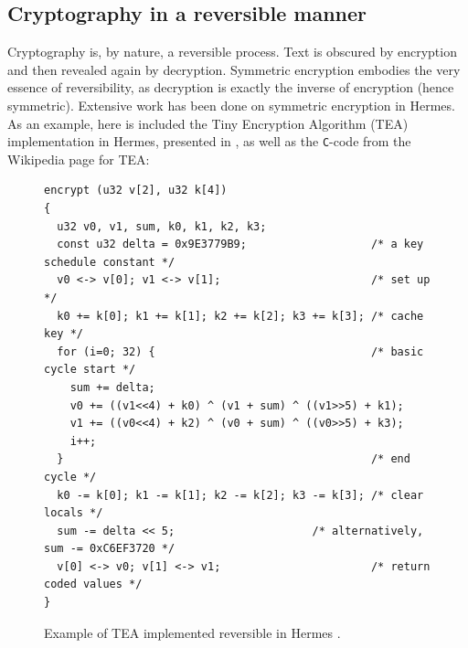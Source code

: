 \subsection{Cryptography in a reversible manner}
\label{reverseCrypt}
Cryptography is, by nature, a reversible process. Text is obscured by encryption and then revealed again by decryption. Symmetric encryption embodies the very essence of reversibility, as decryption is exactly the inverse of encryption (hence symmetric). Extensive work has been done on symmetric encryption in Hermes. As an example, here is included the Tiny Encryption Algorithm (TEA)\cite{TEA} implementation in Hermes, presented in \cite{PSI19}, as well as the \texttt{C}-code from the Wikipedia page for TEA\cite{TEA}:
\begin{figure}[!h]\small
\begin{verbatim}
encrypt (u32 v[2], u32 k[4])
{
  u32 v0, v1, sum, k0, k1, k2, k3;
  const u32 delta = 0x9E3779B9;                   /* a key schedule constant */
  v0 <-> v[0]; v1 <-> v[1];                       /* set up */
  k0 += k[0]; k1 += k[1]; k2 += k[2]; k3 += k[3]; /* cache key */
  for (i=0; 32) {                                 /* basic cycle start */
    sum += delta;
    v0 += ((v1<<4) + k0) ^ (v1 + sum) ^ ((v1>>5) + k1);
    v1 += ((v0<<4) + k2) ^ (v0 + sum) ^ ((v0>>5) + k3);
    i++;
  }                                               /* end cycle */
  k0 -= k[0]; k1 -= k[1]; k2 -= k[2]; k3 -= k[3]; /* clear locals */
  sum -= delta << 5;                     /* alternatively, sum -= 0xC6EF3720 */
  v[0] <-> v0; v[1] <-> v1;                       /* return coded values */
}
\end{verbatim} 
\caption{Example of TEA implemented reversible in Hermes \cite{PSI19}.}
\end{figure}\\
